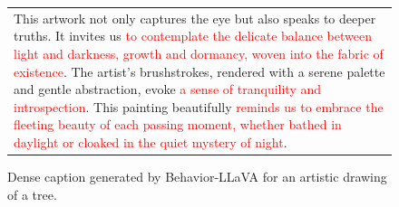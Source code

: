 \begin{figure}[!t]
\begin{minipage}[c]{0.8\textwidth}
\begin{tabular}{p{7cm}}
This artwork not only captures the eye but also speaks to deeper truths. It invites us \textcolor{red}{to contemplate the delicate balance between light and darkness, growth and dormancy, woven into the fabric of existence}. The artist's brushstrokes, rendered with a serene palette and gentle abstraction, evoke \textcolor{red}{a sense of tranquility and introspection}. This painting beautifully \textcolor{red}{reminds us to embrace the fleeting beauty of each passing moment, whether bathed in daylight or cloaked in the quiet mystery of night}.
\end{tabular}
\end{minipage}
\caption{Dense caption generated by Behavior-LLaVA for an artistic drawing of a tree.}
\label{fig:qualitative-image-1}
\end{figure}




